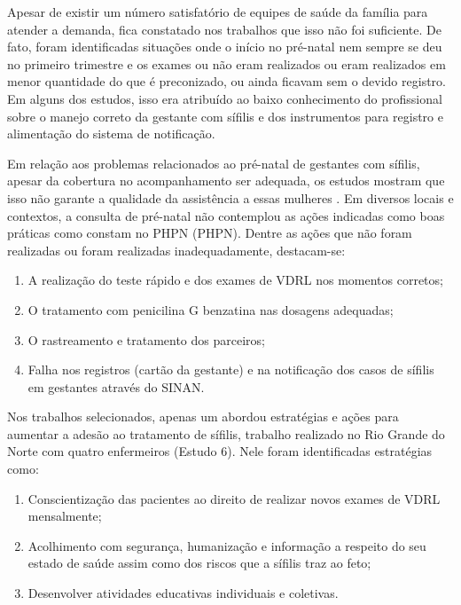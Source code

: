 Apesar de existir um número satisfatório de equipes de saúde da família para atender a demanda, fica constatado nos trabalhos que isso não foi suficiente. De fato, foram identificadas situações onde o início no pré-natal nem sempre se deu no primeiro trimestre e os exames ou não eram realizados ou eram realizados em menor quantidade do que é preconizado, ou ainda ficavam sem o devido registro. Em alguns dos estudos, isso era atribuído ao baixo conhecimento do profissional sobre o manejo correto da gestante com sífilis e dos instrumentos para registro e alimentação do sistema de notificação. \cite{tavares2012monitoramento,da2013sifilis,segatto2015evaluation}

Em relação aos problemas relacionados ao pré-natal  de gestantes com sífilis, apesar da cobertura no acompanhamento ser adequada, os estudos mostram que isso não garante a qualidade da assistência a essas mulheres \cite{tavares2012monitoramento,da2013sifilis,segatto2015evaluation}. Em diversos locais e contextos, a consulta de pré-natal não contemplou as ações indicadas como boas práticas como constam no \acrlong{PHPN} (\acrshort{PHPN}). Dentre as ações que não foram realizadas ou foram realizadas inadequadamente, destacam-se: 

\begin{enumerate}
\item A realização do teste rápido e dos exames de \acrshort{VDRL} nos momentos corretos;
\item O tratamento com penicilina G benzatina nas dosagens adequadas; 
\item O rastreamento e tratamento dos parceiros;
\item Falha nos registros (cartão da gestante) e na notificação dos casos de sífilis em gestantes através do \acrshort{SINAN}.
\end{enumerate}

Nos trabalhos selecionados, apenas um abordou estratégias e ações para aumentar a adesão ao tratamento de sífilis, trabalho realizado no Rio Grande do Norte com quatro enfermeiros (Estudo 6). Nele foram identificadas estratégias como: 

\begin{enumerate}
\item Conscientização das pacientes ao direito de realizar novos exames de VDRL mensalmente;
\item Acolhimento com segurança, humanização e informação a respeito do seu estado de saúde assim como dos riscos que a sífilis traz ao feto;
\item Desenvolver atividades educativas individuais e coletivas.
\end{enumerate}

